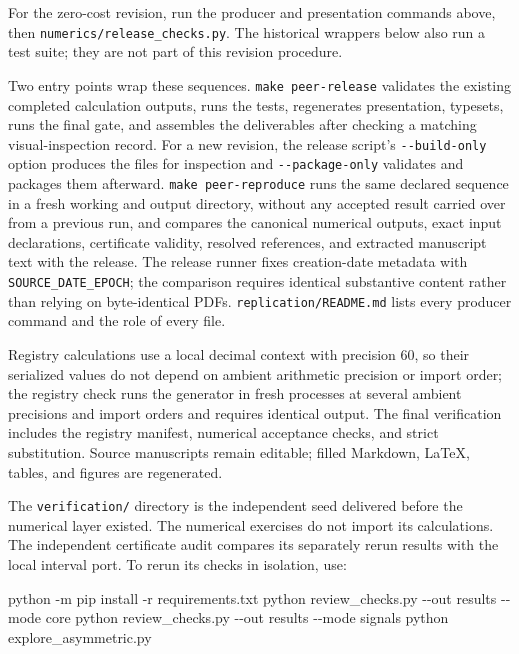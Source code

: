 \documentclass[
  11pt,
]{article}
\newenvironment{Shaded}{}{}
\newcommand{\AttributeTok}[1]{\textcolor[rgb]{0.49,0.56,0.16}{#1}}
\newcommand{\ExtensionTok}[1]{#1}
\newcommand{\NormalTok}[1]{#1}
\begin{document}
For the zero-cost revision, run the producer and presentation commands
above, then \texttt{numerics/release\_checks.py}. The historical
wrappers below also run a test suite; they are not part of this revision
procedure.

Two entry points wrap these sequences. \texttt{make\ peer-release}
validates the existing completed calculation outputs, runs the tests,
regenerates presentation, typesets, runs the final gate, and assembles
the deliverables after checking a matching visual-inspection record. For
a new revision, the release script's \texttt{-\/-build-only} option
produces the files for inspection and \texttt{-\/-package-only}
validates and packages them afterward. \texttt{make\ peer-reproduce}
runs the same declared sequence in a fresh working and output directory,
without any accepted result carried over from a previous run, and
compares the canonical numerical outputs, exact input declarations,
certificate validity, resolved references, and extracted manuscript text
with the release. The release runner fixes creation-date metadata with
\texttt{SOURCE\_DATE\_EPOCH}; the comparison requires identical
substantive content rather than relying on byte-identical PDFs.
\texttt{replication/README.md} lists every producer command and the role
of every file.

Registry calculations use a local decimal context with precision 60, so
their serialized values do not depend on ambient arithmetic precision or
import order; the registry check runs the generator in fresh processes
at several ambient precisions and import orders and requires identical
output. The final verification includes the registry manifest, numerical
acceptance checks, and strict substitution. Source manuscripts remain
editable; filled Markdown, LaTeX, tables, and figures are regenerated.

The \texttt{verification/} directory is the independent seed delivered
before the numerical layer existed. The numerical exercises do not
import its calculations. The independent certificate audit compares its
separately rerun results with the local interval port. To rerun its
checks in isolation, use:

\begin{Shaded}
\begin{Highlighting}[]
\ExtensionTok{python} \AttributeTok{{-}m}\NormalTok{ pip install }\AttributeTok{{-}r}\NormalTok{ requirements.txt}
\ExtensionTok{python}\NormalTok{ review\_checks.py }\AttributeTok{{-}{-}out}\NormalTok{ results }\AttributeTok{{-}{-}mode}\NormalTok{ core}
\ExtensionTok{python}\NormalTok{ review\_checks.py }\AttributeTok{{-}{-}out}\NormalTok{ results }\AttributeTok{{-}{-}mode}\NormalTok{ signals}
\ExtensionTok{python}\NormalTok{ explore\_asymmetric.py}
\end{Highlighting}
\end{Shaded}
\end{document}
